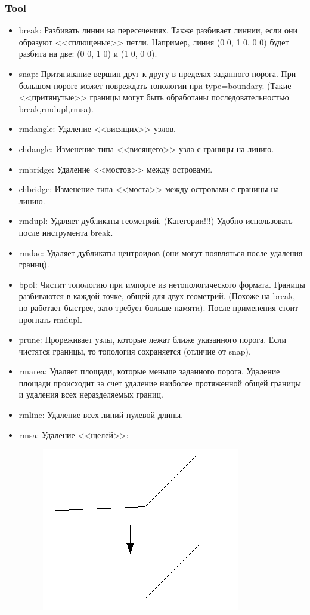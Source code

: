 \begin{frame}[allowframebreaks]
    \frametitle{Tool}
    \begin{itemize}
        \item break: Разбивать линии на пересечениях. Также разбивает линнии, если они образуют <<сплющеные>> петли. Например, линия (0 0, 1 0, 0 0) будет разбита на две: (0 0, 1 0) и (1 0, 0 0).
        \item snap: Притягивание вершин друг к другу в пределах заданного порога. При большом пороге может повреждать топологии при type=boundary. (Такие <<притянутые>> границы могут быть обработаны последовательностью break,rmdupl,rmsa).
        \item rmdangle: Удаление <<висящих>> узлов.
        \item chdangle: Изменение типа <<висящего>> узла с границы на линию.
        \item rmbridge: Удаление <<мостов>> между островами.
        \item chbridge: Изменение типа <<моста>> между островами с границы на линию.
        \item rmdupl: Удаляет дубликаты геометрий. (Категории!!!) Удобно использовать после инструмента break.
        \item rmdac: Удаляет дубликаты центроидов (они могут появляться после удаления границ).
        \item bpol: Чистит топологию при импорте из нетопологического формата. Границы разбиваются в каждой точке, общей для двух геометрий. (Похоже на break, но работает быстрее, зато требует больше памяти). После применения стоит прогнать rmdupl.
        \item prune: Прореживает узлы, которые лежат ближе указанного порога. Если чистятся границы, то топология сохраняется (отличие от snap).
        \item rmarea: Удаляет площади, которые меньше заданного порога. Удаление площади происходит за счет удаление наиболее протяженной общей границы и удаления всех неразделяемых границ.
        \item rmline: Удаление всех линий нулевой длины.
        \item rmsa: Удаление <<щелей>>:
        \begin{figure}[!ht]
            \begin{center}
                \includegraphics[width=0.4\columnwidth]{./grass/img/v_clean_rmsa}
            \end{center}
        \end{figure}
    \end{itemize}
\end{frame}

